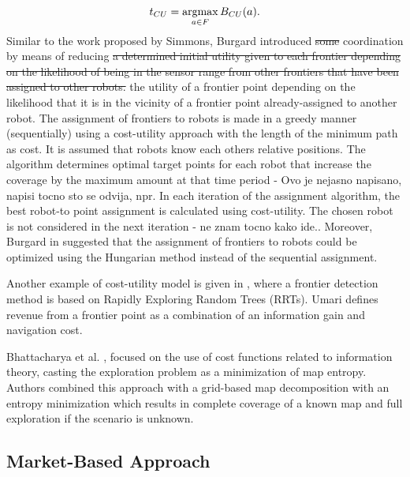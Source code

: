 \begin{equation}
t_{CU} = \operatorname*{argmax}_{a \in F} B_{CU}(a).
\end{equation}
Similar to the work proposed by Simmons, Burgard \cite{Burgard2000} introduced \st{some} coordination by means of reducing \st{a determined initial utility given to each frontier depending on the likelihood of being in the sensor range from other frontiers that have been assigned to other robots.} {\color{red} the utility of a frontier point depending on the likelihood that it is in the vicinity of a frontier point already-assigned to another robot.} The assignment of frontiers to robots is made {\color{red}in a greedy manner} (sequentially) using a cost-utility approach with the length of the minimum path {\color{red}{to a frontier point}} as cost. It is assumed that robots know each others relative positions. {\color{green}The algorithm determines optimal target points for each robot that increase the coverage by the maximum amount at that time period - Ovo je nejasno napisano, napisi tocno sto se odvija, npr. In each iteration of the assignment algorithm, the best robot-to point assignment is calculated using cost-utility. The chosen robot is not considered in the next iteration - ne znam tocno kako ide.}. Moreover, Burgard in \cite{Burgard2005} suggested that the assignment of frontiers to robots could be optimized using the Hungarian method \cite{Kuhn1955} instead of the sequential assignment.

Another example of cost-utility model is given in \cite{Umari2017}, where a frontier detection method is based on Rapidly Exploring Random Trees (RRTs). Umari defines revenue from a frontier point as a combination of an information gain and navigation cost. 
 
Bhattacharya et al. \cite{Bhattacharya2013}, \cite{BhattacharyaGhrist2013} focused on the use of cost functions related to information theory, casting the exploration problem as a minimization of map entropy. Authors combined this approach with a grid-based map decomposition with an entropy minimization which results in complete coverage of a known map and full exploration if the scenario is unknown. 

\subsection{Market-Based Approach}

